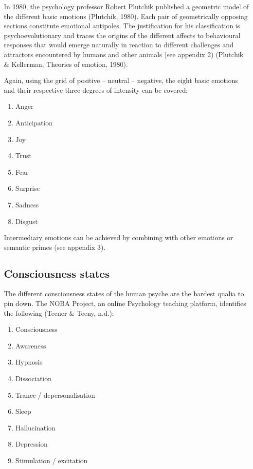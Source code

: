 \noindent In 1980, the psychology professor Robert Plutchik published a geometric model of the different basic emotions  (Plutchik, 1980). Each pair of geometrically opposing sections constitute emotional antipoles. The justification for his classification is psychoevolutionary and traces the origins of the different affects to behavioural responses that would emerge naturally in reaction to different challenges and attractors encountered by humans and other animals (see appendix 2) (Plutchik \& Kellerman, Theories of emotion, 1980).  

Again, using the grid of positive – neutral – negative, the eight basic emotions and their respective three degrees of intensity can be covered: 

\begin{enumerate}
\item   Anger 

\item   Anticipation 

\item   Joy 

\item   Trust 

\item   Fear 

\item   Surprise 
	
\item   Sadness 

\item   Disgust
\end{enumerate}

\noindent Intermediary emotions can be achieved by combining with other emotions or semantic primes (see appendix 3). 

\subsection{Consciousness states}

The different consciousness states of the human psyche are the hardest qualia to pin down. The NOBA Project, an online Psychology teaching platform, identifies the following (Teener \& Teeny, n.d.): 

\begin{enumerate}
\item   Consciousness 

\item   Awareness 

\item   Hypnosis 

\item   Dissociation 

\item   Trance / depersonalisation 

\item   Sleep 

\item   Hallucination 

\item   Depression 

\item   Stimulation / excitation
\end{enumerate}
 

